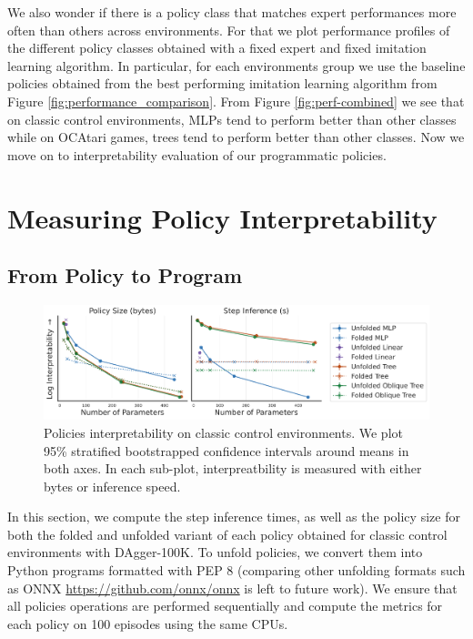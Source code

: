 We also wonder if there is a policy class that matches expert performances more often than others across environments. For that we plot performance profiles of the different policy classes obtained with a fixed expert and fixed imitation learning algorithm. In particular, for each environments group we use the baseline policies obtained from the best performing imitation learning algorithm from Figure \ref{fig:performance_comparison}. From Figure \ref{fig:perf-combined} we see that on classic control environments, MLPs tend to perform better than other classes while on OCAtari games, trees tend to perform better than other classes. Now we move on to interpretability evaluation of our programmatic policies.



\section{Measuring Policy Interpretability}\label{sec:ablation-metric}
\subsection{From Policy to Program}
\begin{figure}
    \centering
    \includegraphics[width=1\linewidth]{images/images_part3/tree_sizes_memory_ppo_ci_ablation.pdf}
    \caption{Policies interpretability on classic control environments. We plot 95\% stratified bootstrapped confidence intervals around means in both axes. In each sub-plot, interpreatbility is measured with either bytes or inference speed.}
    \label{fig:abl-proxies}
\end{figure}

In this section, we compute the step inference times, as well as the policy size for both the folded and unfolded variant of each policy obtained for classic control environments with DAgger-100K. To unfold policies, we convert them into Python programs formatted with PEP 8 (comparing other unfolding formats such as ONNX \url{https://github.com/onnx/onnx} is left to future work). We ensure that all policies operations are performed sequentially and compute the metrics for each policy on 100 episodes using the same CPUs.


